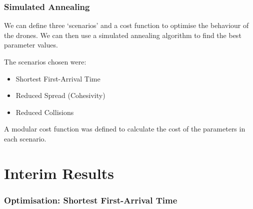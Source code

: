 \documentclass{beamer}
\begin{document}
\begin{frame}
    \frametitle{Simulated Annealing}
    We can define three `scenarios' and a cost function to optimise the behaviour of the drones. We can then use a simulated annealing algorithm to find the best parameter values.

    The scenarios chosen were:
    \begin{itemize}
        \item Shortest First-Arrival Time
        \item Reduced Spread (Cohesivity)
        \item Reduced Collisions
    \end{itemize}

    A modular cost function was defined to calculate the cost of the parameters in each scenario.

\end{frame}

\section{Interim Results}

\begin{frame}
    \frametitle{Optimisation: Shortest First-Arrival Time}
\end{frame}
\end{document}
